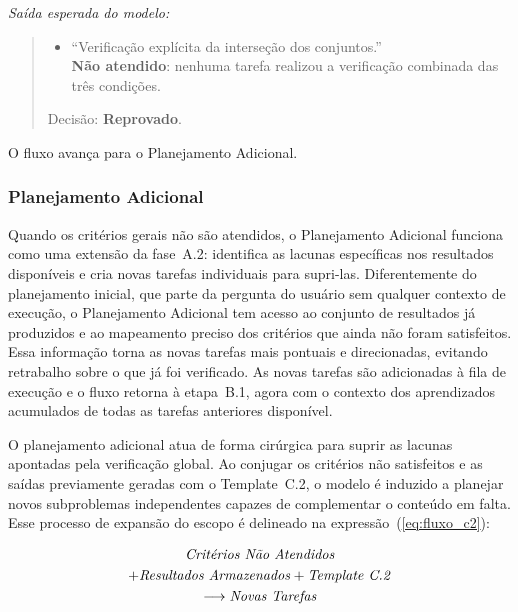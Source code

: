 \documentclass[a4paper,10pt,twocolumn]{article}
\newcommand{\saidaLLM}{%
  \smallskip\noindent\textit{Saída esperada do modelo:}\smallskip\par
}
\begin{document}
\begin{exemplo}
\saidaLLM

\begin{quote}
\begin{itemize}
  \item ``Verificação explícita da interseção dos conjuntos.'' \\ \textbf{Não atendido}: nenhuma tarefa realizou a verificação combinada das três condições.
\end{itemize}
Decisão: \textbf{Reprovado}.
\end{quote}

O fluxo avança para o Planejamento Adicional.
\end{exemplo}


\subsubsection{Planejamento Adicional} \label{subsec:RespostaC2}

Quando os critérios gerais não são atendidos, o Planejamento Adicional funciona como uma extensão da fase~A.2: identifica as lacunas específicas nos resultados disponíveis e cria novas tarefas individuais para supri-las. Diferentemente do planejamento inicial, que parte da pergunta do usuário sem qualquer contexto de execução, o Planejamento Adicional tem acesso ao conjunto de resultados já produzidos e ao mapeamento preciso dos critérios que ainda não foram satisfeitos. Essa informação torna as novas tarefas mais pontuais e direcionadas, evitando retrabalho sobre o que já foi verificado. As novas tarefas são adicionadas à fila de execução e o fluxo retorna à etapa~B.1, agora com o contexto dos aprendizados acumulados de todas as tarefas anteriores disponível.

O planejamento adicional atua de forma cirúrgica para suprir as lacunas apontadas pela verificação global. Ao conjugar os critérios não satisfeitos e as saídas previamente geradas com o Template~C.2, o modelo é induzido a planejar novos subproblemas independentes capazes de complementar o conteúdo em falta. Esse processo de expansão do escopo é delineado na expressão~(\ref{eq:fluxo_c2}):

\begin{multline} \label{eq:fluxo_c2}
\text{\textit{Critérios Não Atendidos}} \\
+ \text{\textit{Resultados Armazenados}} + \text{\textit{Template C.2}} \\
\longrightarrow \text{\textit{Novas Tarefas}}
\end{multline}
\end{document}
